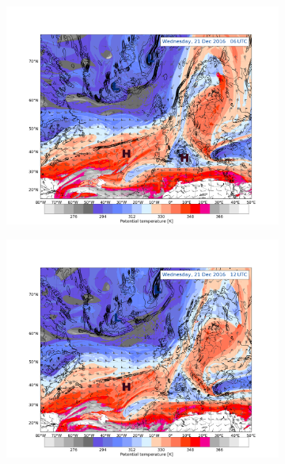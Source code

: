 \begin{figure}[!t]
	\centering
	\begin{subfigure}[b]{0.49\textwidth}
		\includegraphics[trim={4.2cm 0cm 4.3cm 5.1cm},clip,
		width=\textwidth]{./fig_DynTropo/20161221_06}
		\caption{} \label{fig:DT21_06}
	\end{subfigure}
	\begin{subfigure}[b]{0.49\textwidth}
		\includegraphics[trim={4.2cm 0cm 4.3cm 5.1cm},clip,
		width=\textwidth]{./fig_DynTropo/20161221_12}
		\caption{} \label{fig:DT21}
	\end{subfigure}

\end{figure}
